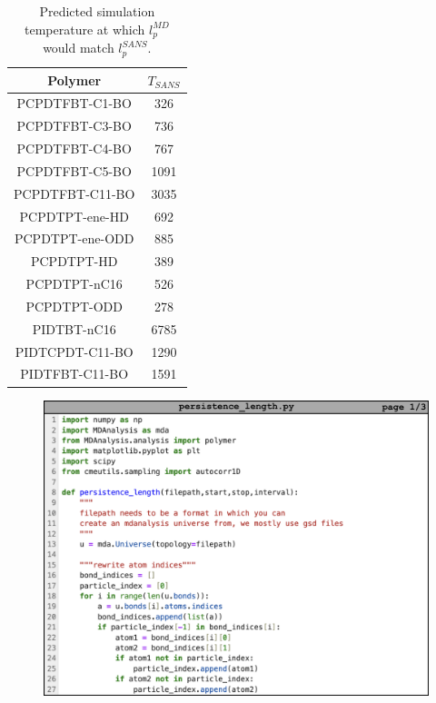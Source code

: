 \begin{table}[ht]
    \centering
    \begin{tabular}{c|c}
    \textbf{Polymer}   &    \textbf{$T_{SANS}$}\\
    \hline
    PCPDTFBT-C1-BO     &    326\\
    PCPDTFBT-C3-BO     &    736\\
    PCPDTFBT-C4-BO     &    767\\
    PCPDTFBT-C5-BO     &    1091\\
    PCPDTFBT-C11-BO    &    3035\\
    PCPDTPT-ene-HD     &    692\\
    PCPDTPT-ene-ODD    &    885\\
    PCPDTPT-HD         &    389\\
    PCPDTPT-nC16       &    526\\
    PCPDTPT-ODD        &    278\\
    PIDTBT-nC16        &    6785\\
    PIDTCPDT-C11-BO    &    1290\\
    PIDTFBT-C11-BO     &    1591\\
    \end{tabular}
    \caption{Predicted simulation temperature at which $l_p^{MD}$ would match $l_p^{SANS}$.}
    \label{tab:T_sans}
\end{table}

\newpage %

\begin{figure}
    \centering
    \includegraphics[width=1\linewidth]{src/figures/pers_l_figs/pers_len1.png}
    \label{fig:pers_len1}
\end{figure}

